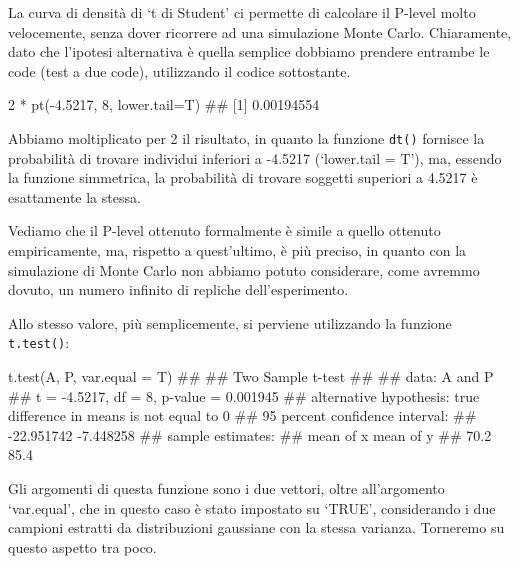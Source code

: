 \documentclass[a4paper,12pt,oneside]{book}
\newenvironment{Shaded}{\begin{snugshade}}{\end{snugshade}}
\newcommand{\DecValTok}[1]{#1}
\newcommand{\FloatTok}[1]{#1}
\newcommand{\SpecialCharTok}[1]{#1}
\newcommand{\DocumentationTok}[1]{#1}
\newcommand{\FunctionTok}[1]{#1}
\newcommand{\AttributeTok}[1]{#1}
\newcommand{\NormalTok}[1]{#1}
\begin{document}
La curva di densità di `t di Student' ci permette di calcolare il P-level molto velocemente, senza dover ricorrere ad una simulazione Monte Carlo. Chiaramente, dato che l'ipotesi alternativa è quella semplice dobbiamo prendere entrambe le code (test a due code), utilizzando il codice sottostante.

\begin{Shaded}
\begin{Highlighting}[]
\DecValTok{2} \SpecialCharTok{*} \FunctionTok{pt}\NormalTok{(}\SpecialCharTok{{-}}\FloatTok{4.5217}\NormalTok{, }\DecValTok{8}\NormalTok{, }\AttributeTok{lower.tail=}\NormalTok{T) }
\DocumentationTok{\#\# [1] 0.00194554}
\end{Highlighting}
\end{Shaded}

Abbiamo moltiplicato per 2 il risultato, in quanto la funzione \texttt{dt()} fornisce la probabilità di trovare individui inferiori a -4.5217 (`lower.tail = T'), ma, essendo la funzione simmetrica, la probabilità di trovare soggetti superiori a 4.5217 è esattamente la stessa.

Vediamo che il P-level ottenuto formalmente è simile a quello ottenuto empiricamente, ma, rispetto a quest'ultimo, è più preciso, in quanto con la simulazione di Monte Carlo non abbiamo potuto considerare, come avremmo dovuto, un numero infinito di repliche dell'esperimento.

Allo stesso valore, più semplicemente, si perviene utilizzando la funzione \texttt{t.test()}:

\begin{Shaded}
\begin{Highlighting}[]
\FunctionTok{t.test}\NormalTok{(A, P, }\AttributeTok{var.equal =}\NormalTok{ T)}
\DocumentationTok{\#\# }
\DocumentationTok{\#\#  Two Sample t{-}test}
\DocumentationTok{\#\# }
\DocumentationTok{\#\# data:  A and P}
\DocumentationTok{\#\# t = {-}4.5217, df = 8, p{-}value = 0.001945}
\DocumentationTok{\#\# alternative hypothesis: true difference in means is not equal to 0}
\DocumentationTok{\#\# 95 percent confidence interval:}
\DocumentationTok{\#\#  {-}22.951742  {-}7.448258}
\DocumentationTok{\#\# sample estimates:}
\DocumentationTok{\#\# mean of x mean of y }
\DocumentationTok{\#\#      70.2      85.4}
\end{Highlighting}
\end{Shaded}

Gli argomenti di questa funzione sono i due vettori, oltre all'argomento `var.equal', che in questo caso è stato impostato su `TRUE', considerando i due campioni estratti da distribuzioni gaussiane con la stessa varianza. Torneremo su questo aspetto tra poco.
\end{document}
